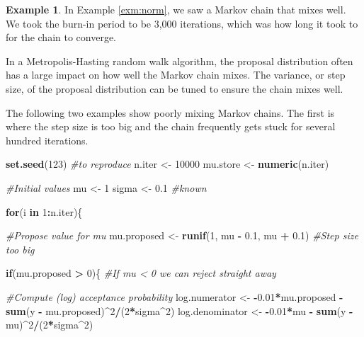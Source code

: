 \documentclass[
]{book}
\newenvironment{Shaded}{\begin{snugshade}}{\end{snugshade}}
\newcommand{\CommentTok}[1]{\textcolor[rgb]{0.56,0.35,0.01}{\textit{#1}}}
\newcommand{\ControlFlowTok}[1]{\textcolor[rgb]{0.13,0.29,0.53}{\textbf{#1}}}
\newcommand{\DecValTok}[1]{\textcolor[rgb]{0.00,0.00,0.81}{#1}}
\newcommand{\FloatTok}[1]{\textcolor[rgb]{0.00,0.00,0.81}{#1}}
\newcommand{\FunctionTok}[1]{\textcolor[rgb]{0.13,0.29,0.53}{\textbf{#1}}}
\newcommand{\NormalTok}[1]{#1}
\newcommand{\OtherTok}[1]{\textcolor[rgb]{0.56,0.35,0.01}{#1}}
\newcommand{\SpecialCharTok}[1]{\textcolor[rgb]{0.81,0.36,0.00}{\textbf{#1}}}
\theoremstyle{definition}
\theoremstyle{definition}
\newtheorem{example}{Example}[chapter]
\theoremstyle{definition}
\theoremstyle{definition}
\theoremstyle{remark}
\begin{document}
\begin{example}
In Example \ref{exm:norm}, we saw a Markov chain that mixes well. We took the burn-in period to be 3,000 iterations, which was how long it took to for the chain to converge.

In a Metropolis-Hasting random walk algorithm, the proposal distribution often has a large impact on how well the Markov chain mixes. The variance, or step size, of the proposal distribution can be tuned to ensure the chain mixes well.

The following two examples show poorly mixing Markov chains. The first is where the step size is too big and the chain frequently gets stuck for several hundred iterations.

\begin{Shaded}
\begin{Highlighting}[]
\FunctionTok{set.seed}\NormalTok{(}\DecValTok{123}\NormalTok{) }\CommentTok{\#to reproduce}
\NormalTok{n.iter   }\OtherTok{\textless{}{-}} \DecValTok{10000}
\NormalTok{mu.store }\OtherTok{\textless{}{-}} \FunctionTok{numeric}\NormalTok{(n.iter)}

\CommentTok{\#Initial values}
\NormalTok{mu }\OtherTok{\textless{}{-}} \DecValTok{1} 
\NormalTok{sigma }\OtherTok{\textless{}{-}} \FloatTok{0.1} \CommentTok{\#known}

\ControlFlowTok{for}\NormalTok{(i }\ControlFlowTok{in} \DecValTok{1}\SpecialCharTok{:}\NormalTok{n.iter)\{}
  
  \CommentTok{\#Propose value for mu}
\NormalTok{  mu.proposed }\OtherTok{\textless{}{-}} \FunctionTok{runif}\NormalTok{(}\DecValTok{1}\NormalTok{, mu }\SpecialCharTok{{-}} \FloatTok{0.1}\NormalTok{, mu }\SpecialCharTok{+} \FloatTok{0.1}\NormalTok{) }\CommentTok{\#Step size too big}
  
  \ControlFlowTok{if}\NormalTok{(mu.proposed }\SpecialCharTok{\textgreater{}} \DecValTok{0}\NormalTok{)\{ }\CommentTok{\#If mu \textless{} 0 we can reject straight away}
    
    \CommentTok{\#Compute (log) acceptance probability}
\NormalTok{    log.numerator   }\OtherTok{\textless{}{-}} \SpecialCharTok{{-}}\FloatTok{0.01}\SpecialCharTok{*}\NormalTok{mu.proposed }\SpecialCharTok{{-}} 
                        \FunctionTok{sum}\NormalTok{(y }\SpecialCharTok{{-}}\NormalTok{ mu.proposed)}\SpecialCharTok{\^{}}\DecValTok{2}\SpecialCharTok{/}\NormalTok{(}\DecValTok{2}\SpecialCharTok{*}\NormalTok{sigma}\SpecialCharTok{\^{}}\DecValTok{2}\NormalTok{)}
\NormalTok{    log.denominator }\OtherTok{\textless{}{-}} \SpecialCharTok{{-}}\FloatTok{0.01}\SpecialCharTok{*}\NormalTok{mu }\SpecialCharTok{{-}} \FunctionTok{sum}\NormalTok{(y }\SpecialCharTok{{-}}\NormalTok{ mu)}\SpecialCharTok{\^{}}\DecValTok{2}\SpecialCharTok{/}\NormalTok{(}\DecValTok{2}\SpecialCharTok{*}\NormalTok{sigma}\SpecialCharTok{\^{}}\DecValTok{2}\NormalTok{)}
    

\end{Highlighting}
\end{Shaded}
\end{example}
\end{document}
